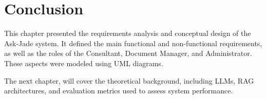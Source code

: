 \section{Conclusion}


This chapter presented the requirements analysis and conceptual design of the Ask-Jade system. It defined the main functional and non-functional requirements, as well as the roles of the Consultant, Document Manager, and Administrator. These aspects were modeled using UML diagrams.

The next chapter, will cover the theoretical background, including LLMs, RAG architectures, and evaluation metrics used to assess system performance.